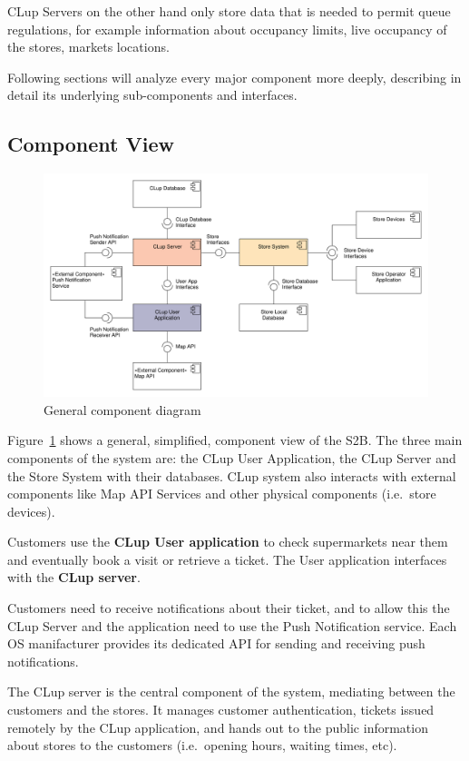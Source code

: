 CLup Servers on the other hand only store data that is needed to permit queue regulations, for example information about occupancy limits, live occupancy of the stores, markets locations.

Following sections will analyze every major component more deeply, describing in detail its underlying sub-components and interfaces.

\subsection{Component View}\label{sect:component_view}
\begin{figure}[H]
    \includegraphics[width=\textwidth]{Images/UML_general_component.pdf}
    \caption{\label{fig:UML_comp_general}General component diagram}
\end{figure}
Figure~\ref{fig:UML_comp_general} shows a general, simplified, component view of the S2B.
The three main components of the system are: the CLup User Application, the CLup Server and the Store System with their databases. CLup system also interacts with external components like Map API Services and other physical components (i.e.~store devices).

Customers use the \textbf{CLup User application} to check supermarkets near them and eventually book a visit or retrieve a ticket. The User application interfaces with the \textbf{CLup server}.

Customers need to receive notifications about their ticket, and to allow this the CLup Server and the application need to use the Push Notification service. Each OS manifacturer provides its dedicated API for sending and receiving push notifications.

The CLup server is the central component of the system, mediating between the customers and the stores. It manages customer authentication, tickets issued remotely by the CLup application, and hands out to the public information about stores to the customers (i.e.~opening hours, waiting times, etc).


